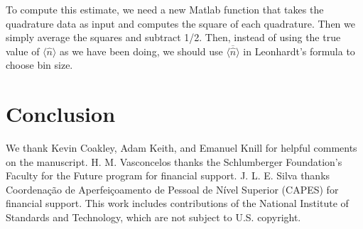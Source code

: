 \documentclass[
reprint,
superscriptaddress,
showpacs,
amsmath,
amssymb,
aps,
pra,
longbibliography
]{revtex4-1}
\begin{document}
To compute this estimate, we need a new Matlab function that takes the
quadrature data as input and computes the square of each quadrature.
Then we simply average the squares and subtract 1/2.  Then, instead of
using the true value of $\langle \hat{n} \rangle$ as we have been
doing, we should use $\overline{\langle \hat{n} \rangle}$ in
Leonhardt's formula to choose bin size.



\section{Conclusion}
\label{conclusion}



\begin{acknowledgments}
We thank Kevin Coakley, Adam Keith, and Emanuel Knill for helpful
comments on the manuscript.  H. M. Vasconcelos thanks the Schlumberger Foundation's Faculty for 
the Future program for financial support. J. L. E. Silva thanks Coordena\c c\~ao de Aperfei\c coamento de 
Pessoal de N\'ivel Superior (CAPES) for financial support. This work includes contributions of the National 
Institute of Standards and Technology, which are not subject to U.S. copyright.
\end{acknowledgments}




%


\end{document}
